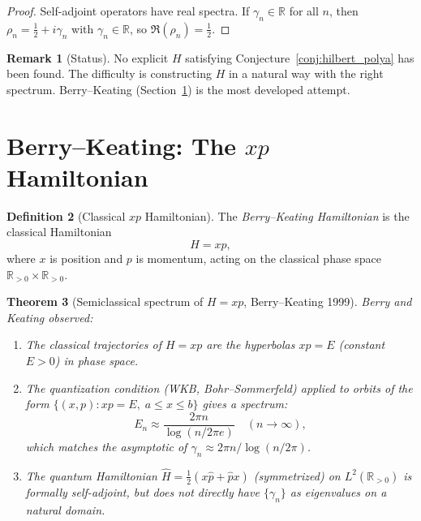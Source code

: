 \documentclass[12pt,a4paper]{amsart}
\newtheorem{theorem}{Theorem}[section]
\theoremstyle{definition}
\newtheorem{definition}[theorem]{Definition}
\newtheorem{remark}[theorem]{Remark}
\newcommand{\R}{\mathbb{R}}
\begin{document}
\begin{proof}
Self-adjoint operators have real spectra.  If $\gamma_n \in \R$ for all $n$,
then $\rho_n = \tfrac{1}{2} + i\gamma_n$ with $\gamma_n \in \R$, so
$\Re(\rho_n) = \tfrac{1}{2}$.
\end{proof}

\begin{remark}[Status]
No explicit $H$ satisfying Conjecture~\ref{conj:hilbert_polya} has been found.
The difficulty is constructing $H$ in a natural way with the right spectrum.
Berry--Keating (Section~\ref{sec:berry_keating}) is the most developed
attempt.
\end{remark}

\section{Berry--Keating: The $xp$ Hamiltonian}
\label{sec:berry_keating}

\begin{definition}[Classical $xp$ Hamiltonian]
\label{def:xp}
The \emph{Berry--Keating Hamiltonian} is the classical Hamiltonian
\[
  H = xp,
\]
where $x$ is position and $p$ is momentum, acting on the classical phase
space $\R_{>0} \times \R_{>0}$.
\end{definition}

\begin{theorem}[Semiclassical spectrum of $H=xp$, Berry--Keating 1999]
\label{thm:berry_keating}
Berry and Keating \cite{BerryKeating1999} observed:

\begin{enumerate}
  \item[\textup{(i)}] The classical trajectories of $H = xp$ are the
    hyperbolas $xp = E$ (constant $E > 0$) in phase space.
  \item[\textup{(ii)}] The quantization condition (WKB, Bohr--Sommerfeld)
    applied to orbits of the form $\{(x,p) : xp = E,\; a \le x \le b\}$
    gives a spectrum:
    \[
      E_n \approx \frac{2\pi n}{\log(n/2\pi e)} \quad (n \to \infty),
    \]
    which matches the asymptotic of $\gamma_n \approx 2\pi n/\log(n/2\pi)$.
  \item[\textup{(iii)}] The quantum Hamiltonian
    $\hat H = \tfrac{1}{2}(x\hat p + \hat p x)$
    (symmetrized) on $L^2(\R_{>0})$ is formally self-adjoint, but
    does not directly have $\{\gamma_n\}$ as eigenvalues on a natural domain.
\end{enumerate}
\end{theorem}
\end{document}

